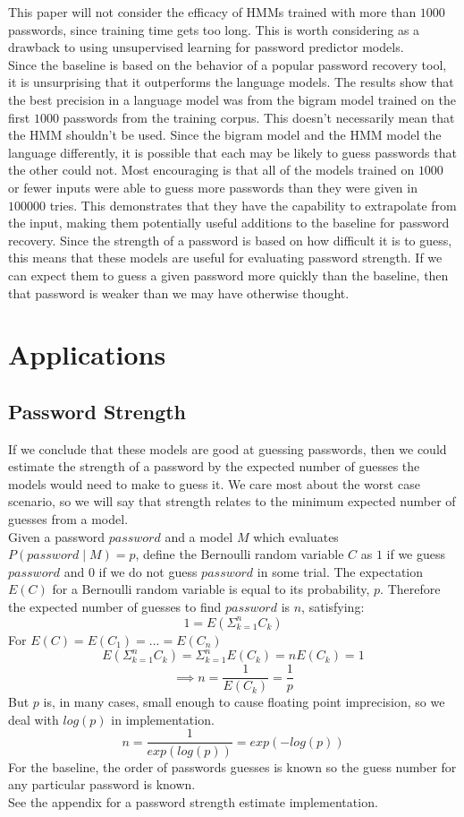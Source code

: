\documentclass{amsart}
\theoremstyle{definition}
\theoremstyle{remark}
\numberwithin{equation}{section}
\begin{document}
This paper will not consider the efficacy of HMMs trained with more than $1000$ passwords, since training time gets too long. This is worth considering as a drawback to using unsupervised learning for password predictor models.\\
Since the baseline is based on the behavior of a popular password recovery tool, it is unsurprising that it outperforms the language models. The results show that the best precision in a language model was from the bigram model trained on the first $1000$ passwords from the training corpus. This doesn't necessarily mean that the HMM shouldn't be used. Since the bigram model and the HMM model the language differently, it is possible that each may be likely to guess passwords that the other could not. Most encouraging is that all of the models trained on $1000$ or fewer inputs were able to guess more passwords than they were given in $100000$ tries. This demonstrates that they have the capability to extrapolate from the input, making them potentially useful additions to the baseline for password recovery. Since the strength of a password is based on how difficult it is to guess, this means that these models are useful for evaluating password strength. If we can expect them to guess a given password more quickly than the baseline, then that password is weaker than we may have otherwise thought.

\section{Applications}
\subsection{Password Strength}
If we conclude that these models are good at guessing passwords, then we could estimate the strength of a password by the expected number of guesses the models would need to make to guess it. We care most about the worst case scenario, so we will say that strength relates to the minimum expected number of guesses from a model.\\
Given a password $password$ and a model $M$ which evaluates $P(password \mid M) = p$, define the Bernoulli random variable $C$ as $1$ if we guess $password$ and $0$ if we do not guess $password$ in some trial. The expectation $E(C)$ for a Bernoulli random variable is equal to its probability, $p$. Therefore the expected number of guesses to find $password$ is $n$, satisfying:\\
$$1 = E(\Sigma_{k = 1}^n C_k)$$
For $E(C) = E(C_1) = ... = E(C_n)$
$$E(\Sigma_{k = 1}^n C_k) = \Sigma_{k = 1}^n E(C_k) = nE(C_k) = 1$$
$$\implies n = \frac{1}{E(C_k)} = \frac{1}{p}$$
But $p$ is, in many cases, small enough to cause floating point imprecision, so we deal with $log(p)$ in implementation.
$$n = \frac{1}{exp(log(p))} = exp(-log(p))$$
For the baseline, the order of passwords guesses is known so the guess number for any particular password is known.\\
See the appendix for a password strength estimate implementation.\\
\end{document}
